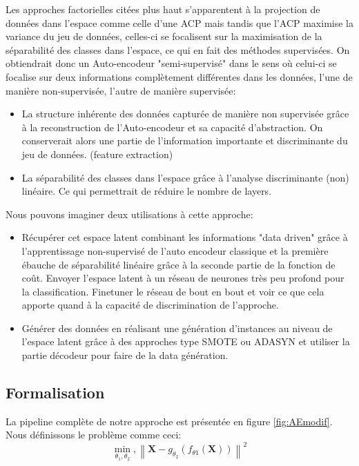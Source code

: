 Les approches factorielles citées plus haut s'apparentent à la projection de données dans l'espace comme celle d'une ACP mais tandis que l'ACP maximise la variance du jeu de données, celles-ci se focalisent sur la maximisation de la séparabilité des classes dans l'espace, ce qui en fait des méthodes supervisées. On obtiendrait donc un Auto-encodeur "semi-supervisé" dans le sens où celui-ci se focalise sur deux informations complètement différentes dans les données, l'une de manière non-supervisée, l'autre de manière supervisée:
\begin{itemize}
    \item La structure inhérente des données capturée de manière non supervisée grâce à la reconstruction de l'Auto-encodeur et sa capacité d'abstraction. On conserverait alors une partie de l'information importante et discriminante du jeu de données. (feature extraction)
    \item La séparabilité des classes dans l'espace grâce à l'analyse discriminante (non) linéaire. Ce qui permettrait de réduire le nombre de layers.
\end{itemize}{}


Nous pouvons imaginer deux utilisations à cette approche:
\begin{itemize}
    \item Récupérer cet espace latent combinant les informations "data driven" grâce à l'apprentissage non-supervisé de l'auto encodeur classique et la première ébauche de séparabilité linéaire grâce à la seconde partie de la fonction de coût. Envoyer l'espace latent à un réseau de neurones très peu profond pour la classification. Finetuner le réseau de bout en bout et voir ce que cela apporte quand à la capacité de discrimination de l'approche. 
    \item Générer des données en réalisant une génération d'instances au niveau de l'espace latent grâce à des approches type SMOTE \cite{chawla2002smote} ou ADASYN \cite{he2008adasyn}  et utiliser la partie décodeur pour  faire de la data génération.
\end{itemize}

\subsection{Formalisation}
La pipeline complète de notre approche est présentée en figure \ref{fig:AEmodif}.
Nous définissons le problème comme ceci: \newline
$$\min _{\theta_{1}, \theta_{2}},\left\|\mathbf{X}-g_{\theta_{2}}\left(f_{\theta 1}(\mathbf{X})\right)\right\|^{2}$$


